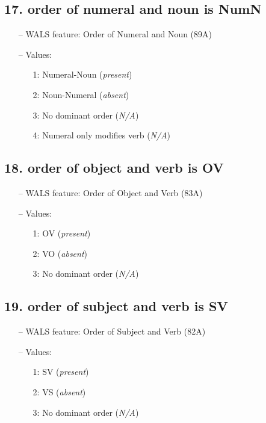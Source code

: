 \subsection*{17. order of numeral and noun is NumN}

\begin{itemize}
  \item[--] WALS feature: Order of Numeral and Noun (89A)
  \item[--] Values:
  {\small
  \begin{enumerate}
    \item[1:] Numeral-Noun (\emph{present})
    \item[2:] Noun-Numeral (\emph{absent})
    \item[3:] No dominant order (\emph{N/A})
    \item[4:] Numeral only modifies verb (\emph{N/A})
  \end{enumerate}
  }
\end{itemize}


\subsection*{18. order of object and verb is OV}

\begin{itemize}
  \item[--] WALS feature: Order of Object and Verb (83A)
  \item[--] Values:
  {\small
  \begin{enumerate}
    \item[1:] OV (\emph{present})
    \item[2:] VO (\emph{absent})
    \item[3:] No dominant order (\emph{N/A})
  \end{enumerate}
  }
\end{itemize}


\subsection*{19. order of subject and verb is SV}

\begin{itemize}
  \item[--] WALS feature: Order of Subject and Verb (82A)
  \item[--] Values:
  {\small
  \begin{enumerate}
    \item[1:] SV (\emph{present})
    \item[2:] VS (\emph{absent})
    \item[3:] No dominant order (\emph{N/A})
  \end{enumerate}
  }
\end{itemize}


